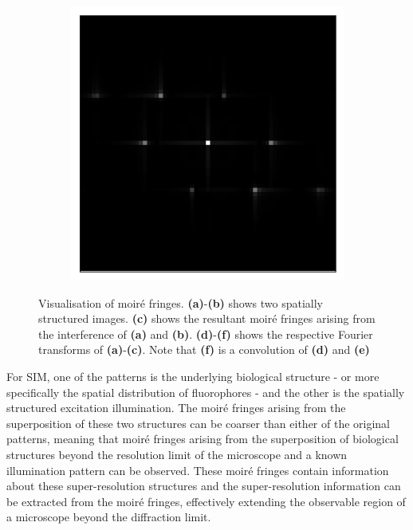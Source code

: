 \begin{figure}[h]
\begin{subfigure}[t]{0.3\textwidth}
		\caption{}
		\label{fig:fringes_2_ft}
	\end{subfigure}
	\begin{subfigure}[t]{0.3\textwidth}
		\centering
		\includegraphics[width=\linewidth]{images/fringes_moire_ft_kx_16_and_12_ky_0_and_12.png}
		\caption{}
		\label{fig:fringes_moire_ft}
	\end{subfigure}
	\caption[Visualisation of moir\'{e} fringes]{Visualisation of moir\'{e} 
		fringes. \textbf{(a)}-\textbf{(b)} shows two spatially structured images. 
		\textbf{(c)} shows the resultant moir\'{e} fringes arising from the 
		interference of \textbf{(a)} and \textbf{(b)}. \textbf{(d)}-\textbf{(f)} 
		shows the respective Fourier transforms of \textbf{(a)}-\textbf{(c)}. 
		Note that \textbf{(f)} is a convolution of \textbf{(d)} and \textbf{(e)}}
	\label{fig:moire_visualisation}
\end{figure}

For SIM, one of the patterns is the underlying biological structure - or more 
specifically the spatial distribution of fluorophores - and the other is the 
spatially structured excitation illumination. The moir\'{e} fringes arising 
from the superposition of these two structures can be coarser than either of 
the original patterns, meaning that moir\'{e} fringes arising from the 
superposition of biological structures beyond the resolution limit of the 
microscope and a known illumination pattern can be observed. These moir\'{e} 
fringes contain information about these super-resolution structures and the
super-resolution information can be extracted from the moir\'{e} fringes, 
effectively extending the observable region of a microscope beyond the 
diffraction limit\cite{gustafsson2000surpassing}.

